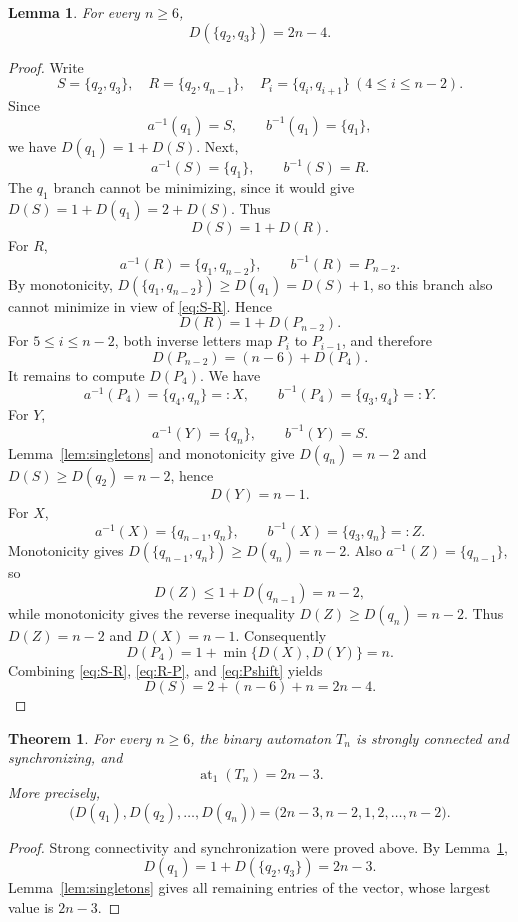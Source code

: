 \documentclass[11pt]{article}
\newtheorem{theorem}{Theorem}
\newtheorem{lemma}{Lemma}
\theoremstyle{definition}
\theoremstyle{remark}
\begin{document}
\begin{lemma}\label{lem:pair}
For every $n\ge6$,
\[
D(\{q_2,q_3\})=2n-4.
\]
\end{lemma}
\begin{proof}
Write
\[
S=\{q_2,q_3\},\quad R=\{q_2,q_{n-1}\},\quad
P_i=\{q_i,q_{i+1}\}\ (4\le i\le n-2).
\]
Since
\[
a^{-1}(q_1)=S,\qquad b^{-1}(q_1)=\{q_1\},
\]
we have $D(q_1)=1+D(S)$. Next,
\[
a^{-1}(S)=\{q_1\},\qquad b^{-1}(S)=R.
\]
The $q_1$ branch cannot be minimizing, since it would give
$D(S)=1+D(q_1)=2+D(S)$. Thus
\begin{equation}\label{eq:S-R}
D(S)=1+D(R).
\end{equation}
For $R$,
\[
a^{-1}(R)=\{q_1,q_{n-2}\},\qquad b^{-1}(R)=P_{n-2}.
\]
By monotonicity, $D(\{q_1,q_{n-2}\})\ge D(q_1)=D(S)+1$, so this branch also cannot minimize in view of \eqref{eq:S-R}. Hence
\begin{equation}\label{eq:R-P}
D(R)=1+D(P_{n-2}).
\end{equation}
For $5\le i\le n-2$, both inverse letters map $P_i$ to $P_{i-1}$, and therefore
\begin{equation}\label{eq:Pshift}
D(P_{n-2})=(n-6)+D(P_4).
\end{equation}
It remains to compute $D(P_4)$. We have
\[
a^{-1}(P_4)=\{q_4,q_n\}=:X,\qquad
b^{-1}(P_4)=\{q_3,q_4\}=:Y.
\]
For $Y$,
\[
a^{-1}(Y)=\{q_n\},\qquad b^{-1}(Y)=S.
\]
Lemma~\ref{lem:singletons} and monotonicity give
$D(q_n)=n-2$ and $D(S)\ge D(q_2)=n-2$, hence
\[
D(Y)=n-1.
\]
For $X$,
\[
a^{-1}(X)=\{q_{n-1},q_n\},\qquad
b^{-1}(X)=\{q_3,q_n\}=:Z.
\]
Monotonicity gives $D(\{q_{n-1},q_n\})\ge D(q_n)=n-2$. Also
$a^{-1}(Z)=\{q_{n-1}\}$, so
\[
D(Z)\le1+D(q_{n-1})=n-2,
\]
while monotonicity gives the reverse inequality $D(Z)\ge D(q_n)=n-2$. Thus $D(Z)=n-2$ and $D(X)=n-1$. Consequently
\[
D(P_4)=1+\min\{D(X),D(Y)\}=n.
\]
Combining \eqref{eq:S-R}, \eqref{eq:R-P}, and \eqref{eq:Pshift} yields
\[
D(S)=2+(n-6)+n=2n-4.
\]
\end{proof}

\begin{theorem}\label{thm:main}
For every $n\ge6$, the binary automaton $T_n$ is strongly connected and synchronizing, and
\[
\operatorname{at}_1(T_n)=2n-3.
\]
More precisely,
\[
\bigl(D(q_1),D(q_2),\ldots,D(q_n)\bigr)
=\bigl(2n-3,n-2,1,2,\ldots,n-2\bigr).
\]
\end{theorem}
\begin{proof}
Strong connectivity and synchronization were proved above. By Lemma~\ref{lem:pair},
\[
D(q_1)=1+D(\{q_2,q_3\})=2n-3.
\]
Lemma~\ref{lem:singletons} gives all remaining entries of the vector, whose largest value is $2n-3$.
\end{proof}
\end{document}
